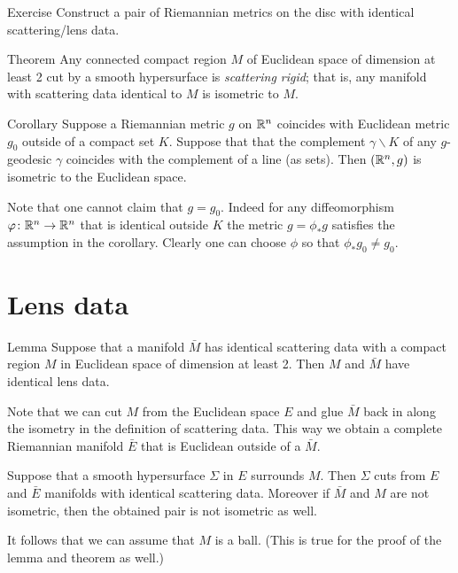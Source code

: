\begin{thm}{Exercise}
Construct a pair of Riemannian metrics on the disc with identical scattering/lens data.
\end{thm}

\begin{thm}{Theorem}\label{thm:magic-cloak}
Any connected compact region $M$ of Euclidean space of dimension at least 2 cut by a smooth hypersurface is \emph{scattering rigid};
that is, any manifold with scattering data identical to $M$ is isometric to $M$.
\end{thm}

\begin{thm}{Corollary}
Suppose a Riemannian metric $g$ on $\mathbb{R}^n$ coincides with Euclidean metric $g_0$ outside of a compact set $K$.
Suppose that that the complement $\gamma\backslash K$ of any $g$-geodesic $\gamma$ coincides with the complement of a line (as sets).
Then $(\mathbb{R}^n,g)$ is isometric to the Euclidean space.
\end{thm}

Note that one cannot claim that $g=g_0$.
Indeed for any diffeomorphism $\varphi\colon\mathbb{R}^n\to\mathbb{R}^n$ that is identical outside $K$ the metric $g=\phi_*g$ satisfies the assumption in the corollary.
Clearly one can choose $\phi$ so that $\phi_*g_0\ne g_0$.


\section{Lens data}

\begin{thm}{Lemma}\label{lem:no-delay}
Suppose that a manifold $\bar M$ has identical scattering data with a compact region $M$ in Euclidean space of dimension at least 2.
Then $M$ and $\bar M$ have identical lens data. 
\end{thm}

Note that we can cut $M$ from the Euclidean space $E$ and glue $\bar M$ back in along the isometry in the definition of scattering data.
This way we obtain a complete Riemannian manifold $\bar E$ that is Euclidean outside of a $\bar M$.

Suppose that a smooth hypersurface $\Sigma$ in $E$ surrounds $M$.
Then $\Sigma$ cuts from $E$ and $\bar E$ manifolds with identical scattering data.
Moreover if $\bar M$ and $M$ are not isometric,
then the obtained pair is not isometric as well.

It follows that we can assume that $M$ is a ball.
(This is true for the proof of the lemma and theorem as well.)


